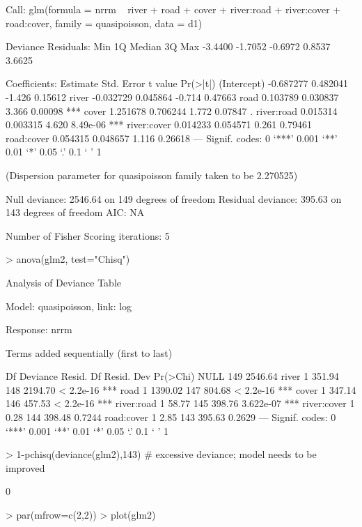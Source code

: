 \documentclass{article}
\begin{document}
\begin{Schunk}
\begin{Soutput}
Call:
glm(formula = nrrm ~ river + road + cover + river:road + river:cover + 
    road:cover, family = quasipoisson, data = d1)

Deviance Residuals: 
    Min       1Q   Median       3Q      Max  
-3.4400  -1.7052  -0.6972   0.8537   3.6625  

Coefficients:
             Estimate Std. Error t value Pr(>|t|)    
(Intercept) -0.687277   0.482041  -1.426  0.15612    
river       -0.032729   0.045864  -0.714  0.47663    
road         0.103789   0.030837   3.366  0.00098 ***
cover        1.251678   0.706244   1.772  0.07847 .  
river:road   0.015314   0.003315   4.620 8.49e-06 ***
river:cover  0.014233   0.054571   0.261  0.79461    
road:cover   0.054315   0.048657   1.116  0.26618    
---
Signif. codes:  0 ‘***’ 0.001 ‘**’ 0.01 ‘*’ 0.05 ‘.’ 0.1 ‘ ’ 1

(Dispersion parameter for quasipoisson family taken to be 2.270525)

    Null deviance: 2546.64  on 149  degrees of freedom
Residual deviance:  395.63  on 143  degrees of freedom
AIC: NA

Number of Fisher Scoring iterations: 5
\end{Soutput}
\begin{Sinput}
> anova(glm2, test="Chisq")
\end{Sinput}
\begin{Soutput}
Analysis of Deviance Table

Model: quasipoisson, link: log

Response: nrrm

Terms added sequentially (first to last)


            Df Deviance Resid. Df Resid. Dev  Pr(>Chi)    
NULL                          149    2546.64              
river        1   351.94       148    2194.70 < 2.2e-16 ***
road         1  1390.02       147     804.68 < 2.2e-16 ***
cover        1   347.14       146     457.53 < 2.2e-16 ***
river:road   1    58.77       145     398.76 3.622e-07 ***
river:cover  1     0.28       144     398.48    0.7244    
road:cover   1     2.85       143     395.63    0.2629    
---
Signif. codes:  0 ‘***’ 0.001 ‘**’ 0.01 ‘*’ 0.05 ‘.’ 0.1 ‘ ’ 1
\end{Soutput}
\begin{Sinput}
> 1-pchisq(deviance(glm2),143) # excessive deviance; model needs to be improved
\end{Sinput}
\begin{Soutput}
[1] 0
\end{Soutput}
\begin{Sinput}
> par(mfrow=c(2,2))
> plot(glm2)
\end{Sinput}
\end{Schunk}
\end{document}
